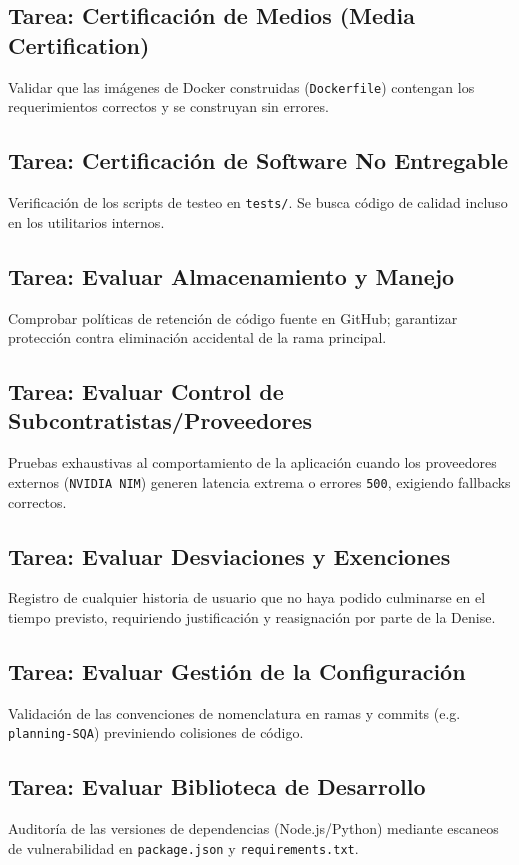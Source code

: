 \documentclass[12pt,a4paper]{article}
\begin{document}
\subsection{Tarea: Certificación de Medios (Media Certification)}
Validar que las imágenes de Docker construidas (\texttt{Dockerfile}) contengan los requerimientos correctos y se construyan sin errores.

\subsection{Tarea: Certificación de Software No Entregable}
Verificación de los scripts de testeo en \texttt{tests/}. Se busca código de calidad incluso en los utilitarios internos.

\subsection{Tarea: Evaluar Almacenamiento y Manejo}
Comprobar políticas de retención de código fuente en GitHub; garantizar protección contra eliminación accidental de la rama principal.

\subsection{Tarea: Evaluar Control de Subcontratistas/Proveedores}
Pruebas exhaustivas al comportamiento de la aplicación cuando los proveedores externos (\texttt{NVIDIA NIM}) generen latencia extrema o errores \texttt{500}, exigiendo fallbacks correctos.

\subsection{Tarea: Evaluar Desviaciones y Exenciones}
Registro de cualquier historia de usuario que no haya podido culminarse en el tiempo previsto, requiriendo justificación y reasignación por parte de la Denise.

\subsection{Tarea: Evaluar Gestión de la Configuración}
Validación de las convenciones de nomenclatura en ramas y commits (e.g. \texttt{planning-SQA}) previniendo colisiones de código.

\subsection{Tarea: Evaluar Biblioteca de Desarrollo}
Auditoría de las versiones de dependencias (Node.js/Python) mediante escaneos de vulnerabilidad en \texttt{package.json} y \texttt{requirements.txt}.
\end{document}
